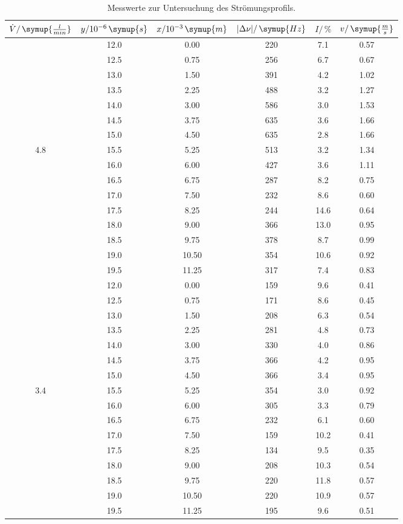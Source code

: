 \begin{table}[htbp]
\centering
\caption{Messwerte zur Untersuchung des Strömungsprofils.}
\label{tab:profil}
\begin{tabular}{S[table-format=2.1] S[table-format=2.2] S[table-format=2.3] S[table-format=2.2] S[table-format=2.3] S[table-format=1.2]  }
\toprule
{$\dot{V}/ \, \symup{\frac{l}{min}}$} & {$y/10^{-6}\, \symup{s}$} &  {$x/10^{-3}\, \symup{m}$} & {$\lvert \Delta \nu \rvert / \, \symup{Hz}$} & {$I/\, \%$} &  {$v /\,\symup{\frac{m}{s}}$}\\
\midrule
       & 12.0 & 0.00   & 220 & 7.1 & 0.57\\
       & 12.5 & 0.75 & 256 & 6.7 & 0.67\\
       & 13.0 & 1.50   & 391 & 4.2 & 1.02\\
       & 13.5 & 2.25 & 488 & 3.2 & 1.27\\
       & 14.0 & 3.00   & 586 & 3.0 & 1.53\\
       & 14.5 & 3.75 & 635 & 3.6 & 1.66\\
       & 15.0 & 4.50   & 635 & 2.8 & 1.66\\
4.8    & 15.5 & 5.25 & 513 & 3.2 & 1.34\\
       & 16.0 & 6.00   & 427 & 3.6 & 1.11\\
       & 16.5 & 6.75 & 287 & 8.2 & 0.75\\
       & 17.0 & 7.50   & 232 & 8.6 & 0.60\\
       & 17.5 & 8.25 & 244 & 14.6 & 0.64\\
       & 18.0 & 9.00  & 366 & 13.0 & 0.95\\
       & 18.5 & 9.75 & 378 & 8.7 & 0.99\\
       & 19.0 & 10.50  & 354 & 10.6 & 0.92\\
       & 19.5 & 11.25 & 317 & 7.4 & 0.83\\
\midrule
       & 12.0 & 0.00    & 159 & 9.6 & 0.41\\
       & 12.5 & 0.75 & 171 & 8.6 & 0.45\\
       & 13.0 & 1.50  & 208 & 6.3 & 0.54\\
       & 13.5 & 2.25 & 281 & 4.8 & 0.73\\
       & 14.0 & 3.00 & 330 & 4.0 & 0.86\\
       & 14.5 & 3.75 & 366 & 4.2 & 0.95\\
       & 15.0 & 4.50 & 366 & 3.4 & 0.95\\
3.4    & 15.5 & 5.25 & 354 & 3.0 & 0.92\\
       & 16.0 & 6.00 & 305 & 3.3 & 0.79\\
       & 16.5 & 6.75 & 232 & 6.1 & 0.60 \\
       & 17.0 & 7.50 & 159 & 10.2 & 0.41\\
       & 17.5 & 8.25 & 134 & 9.5 & 0.35\\
       & 18.0 & 9.00 & 208 & 10.3 & 0.54\\
       & 18.5 & 9.75 & 220 & 11.8 & 0.57\\
       & 19.0 & 10.50 & 220 & 10.9 & 0.57\\
       & 19.5 & 11.25 & 195 & 9.6 & 0.51\\


\end{tabular}
\end{table}
